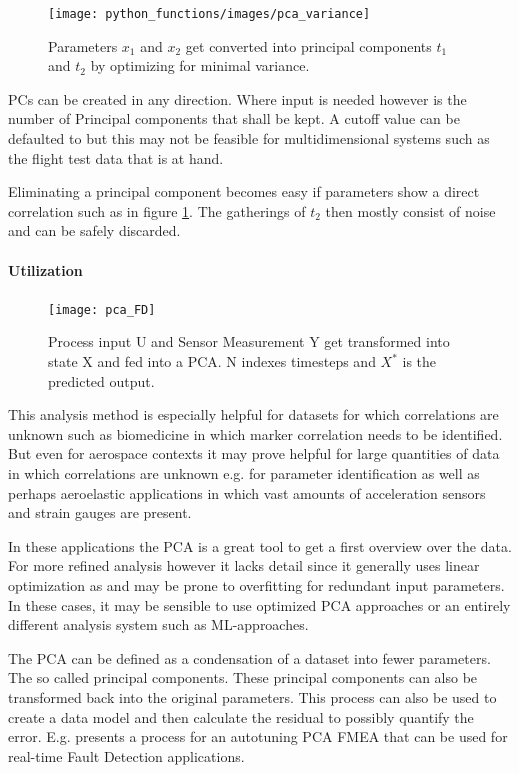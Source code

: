 \begin{figure}[h]
    \centering
    \texttt{[image: python\_functions/images/pca\_variance]}
    \caption{Parameters $x_1$ and $x_2$ get converted into principal components $t_1$ and $t_2$ by optimizing for minimal variance.}
    \label{fig:pca_variance}
\end{figure}

PCs can be created in any direction. Where input is needed however is the number of Principal components that shall be kept. A cutoff value can be defaulted to but this may not be feasible for multidimensional systems such as the flight test data that is at hand.


Eliminating a principal component becomes easy if parameters show a direct correlation such as in figure \ref{fig:pca_variance}. The gatherings of $t_2$ then mostly consist of noise and can be safely discarded.


\paragraph{Utilization}
\par
\begin{figure}
    \vspace{-20pt}
    \centering
    \texttt{[image: pca\_FD]}
    \caption{Process input U and Sensor Measurement Y get transformed into state X and fed into a PCA. N indexes timesteps and $X^*$ is the predicted output.\cite[p.268]{isermann_fault-diagnosis_2006}}
    \label{fig:pca_FD}
\end{figure}

This analysis method is especially helpful for datasets for which correlations are unknown such as biomedicine in which marker correlation needs to be identified. But even for aerospace contexts it may prove helpful for large quantities of data in which correlations are unknown e.g. for parameter identification as well as perhaps aeroelastic applications in which vast amounts of acceleration sensors and strain gauges are present.

In these applications the PCA is a great tool to get a first overview over the data. For more refined analysis however it lacks detail since it generally uses linear optimization as and may be prone to overfitting for redundant input parameters. In these cases, it may be sensible to use optimized PCA approaches or an entirely different analysis system such as ML-approaches.

The PCA can be defined as a condensation of a dataset into fewer parameters. The so called principal components. These principal components can also be transformed back into the original parameters. This process can also be used to create a data model and then calculate the residual to possibly quantify the error. E.g. \textcite{isermann_fault-diagnosis_2006} presents a process for an autotuning PCA FMEA that can be used for real-time Fault Detection applications.

